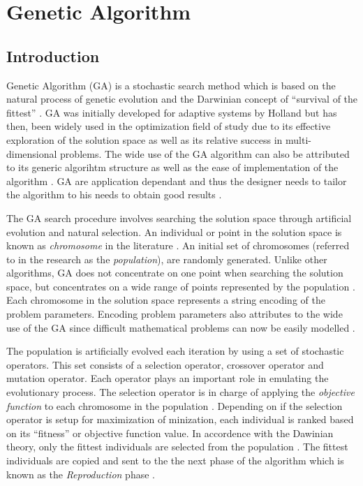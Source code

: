 \section{Genetic Algorithm}
\subsection{Introduction}
Genetic Algorithm (GA) is a stochastic search method which is based on the natural process of genetic evolution and the Darwinian concept of ``survival of the fittest'' \cite{DistributedHierarchicalGA,AcceleratingGA,AdaptiveSAGA,FamilyGA}. GA was initially developed for adaptive systems by Holland but has then, been widely used in the optimization field of study due to its effective exploration of the solution space as well as its relative success in multi-dimensional problems\cite{ParallelGASA,DistributedHierarchicalGA,FamilyGA}. The wide use of the GA algorithm can also be attributed to its generic algorihtm structure as well as the ease of implementation of the algorithm \cite{FamilyGA,AdaptiveSAGA}. GA are application dependant and thus the designer needs to tailor the algorithm to his needs to obtain good results \cite{AcceleratingGA}.

The GA search procedure involves searching the solution space through artificial evolution and natural selection\cite{FamilyGA,MultiPopGA,HybridIntelliGA}. An individual or point in the solution space is known as \emph{chromosome} in the literature \cite{HumanPassiveGA}. An initial set of chromosomes (referred to in the research as the \emph{population}), are randomly generated\cite{FamilyGA,HybridIntelliGA,AcceleratingGA,MultiPopGA}. Unlike other algorithms, GA does not concentrate on one point when searching the solution space, but concentrates on a wide range of points represented by the population \cite{DistributedHierarchicalGA,FamilyGA,HybridIntelliGA}. Each chromosome in the solution space represents a string encoding of the problem parameters\cite{FamilyGA}. Encoding problem parameters also attributes to the wide use of the GA since difficult mathematical problems can now be easily modelled \cite{AcceleratingGA}.

The population is artificially evolved each iteration by using a set of stochastic operators\cite{SelfAdaptiveGA}. This set consists of a selection operator, crossover operator and mutation operator\cite{SelfAdaptiveGA,MultiPopGA}. Each operator plays an important role in emulating the evolutionary process. The selection operator is in charge of applying the \emph{objective function} to each chromosome in the population \cite{AdaptiveSAGA,HumanPassiveGA}. Depending on if the selection operator is setup for maximization of minization, each individual is ranked based on its ``fitness'' or objective function value. In accordence with the Dawinian theory, only the fittest individuals are selected from the population \cite{HumanPassiveGA}. The fittest individuals are copied and sent to the the next phase of the algorithm which is known as the \emph{Reproduction} phase \cite{HumanPassiveGA}.

